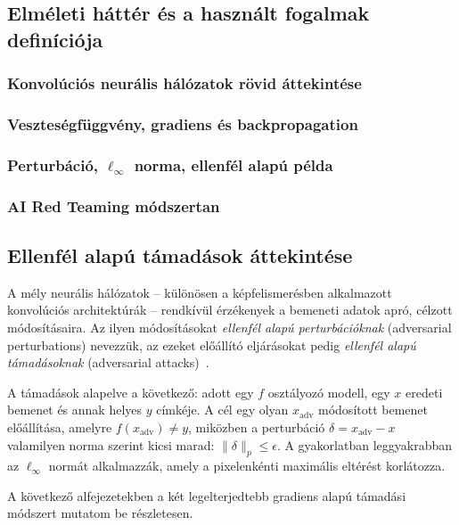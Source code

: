 \documentclass[12pt,a4paper]{article}
\begin{document}
\subsection{Elméleti háttér és a használt fogalmak definíciója}

\subsubsection{Konvolúciós neurális hálózatok rövid áttekintése}

\subsubsection{Veszteségfüggvény, gradiens és backpropagation}

\subsubsection{Perturbáció, $\ell_\infty$ norma, ellenfél alapú példa}

\subsubsection{AI Red Teaming módszertan}

\subsection{Ellenfél alapú támadások áttekintése}

A mély neurális hálózatok -- különösen a képfelismerésben alkalmazott konvolúciós architektúrák -- rendkívül
érzékenyek a bemeneti adatok apró, célzott módosításaira. Az ilyen módosításokat \textit{ellenfél alapú
perturbációknak} (adversarial perturbations) nevezzük, az ezeket előállító eljárásokat pedig \textit{ellenfél
alapú támadásoknak} (adversarial attacks)~\cite{goodfellow2015explaining}.

A támadások alapelve a következő: adott egy $f$ osztályozó modell, egy $x$ eredeti bemenet és annak helyes
$y$ címkéje. A cél egy olyan $x_{\mathrm{adv}}$ módosított bemenet előállítása, amelyre
$f(x_{\mathrm{adv}}) \neq y$, miközben a perturbáció $\delta = x_{\mathrm{adv}} - x$ valamilyen norma
szerint kicsi marad: $\|\delta\|_p \leq \epsilon$. A gyakorlatban leggyakrabban az $\ell_\infty$ normát
alkalmazzák, amely a pixelenkénti maximális eltérést korlátozza.

A következő alfejezetekben a két legelterjedtebb gradiens alapú támadási módszert mutatom be részletesen.
\end{document}
